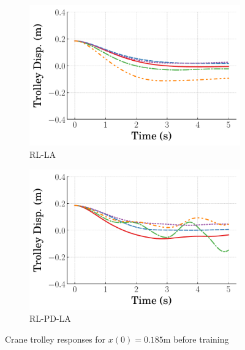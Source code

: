 \begin{figure}[tb]
\begin{subfigure}[b]{0.49\textwidth}
        \centering
        \includegraphics[width=\textwidth]{figures/figures_RL_model_based_control/time_responses_crane/dpcrane_RL_LA/Cart_displacement_0p185_init_0_steps.pdf}
        \caption{RL-LA}
        \label{subfig_chap2:dpcrane_trolley_resp_0steps_RL_LA}
    \end{subfigure}
    \hfill
    \begin{subfigure}[b]{0.49\textwidth}
        \centering
        \includegraphics[width=\textwidth]{figures/figures_RL_model_based_control/time_responses_crane/dpcrane_RL_PD_LA/Cart_displacement_0p185_init_0_steps.pdf}
        \caption{RL-PD-LA}
        \label{subfig_chap2:dpcrane_trolley_resp_0steps_RL_PD_LA}
    \end{subfigure}
    \hfill
    \caption{Crane trolley responses for $x(0)=0.185\si{\meter}$ before training}
    \label{fig_chap2:dpcrane_trolley_resp_0steps}
\end{figure}
%


